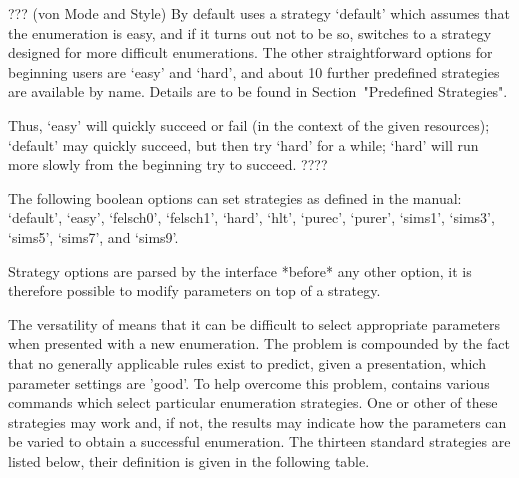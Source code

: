 \enditems



??? (von Mode and Style)
By default  {\ACE} uses  a strategy `default'  which assumes  that the
enumeration is easy, and if it turns out not to be so, {\ACE} switches
to  a strategy designed  for more  difficult enumerations.   The other
straightforward options for beginning users are `easy' and `hard', and
about 10 further predefined  strategies are available by name. Details
are to be found in Section~"Predefined Strategies".

Thus, `easy' will quickly succeed or fail (in the context of the given
resources); `default' may  quickly succeed, but then try  `hard' for a
while; `hard' will run more slowly from the beginning try to succeed.
????






The following  boolean options  can set strategies  as defined  in the
{\ACE} manual: `default', `easy', `felsch0', `felsch1', `hard', `hlt',
`purec', `purer', `sims1', `sims3', `sims5', `sims7', and `sims9'.

Strategy options are parsed by the interface *before* any other option, it
is therefore possible to modify parameters on top of a strategy.

The versatility  of {\ACE}  means that it  can be difficult  to select
appropriate  parameters when  presented with  a new  enumeration.  The
problem is compounded  by the fact that no  generally applicable rules
exist to  predict, given a presentation, which  parameter settings are
'good'.   To help  overcome  this problem,  {\ACE} contains  various
commands which select particular enumeration strategies.  One or other
of these strategies may work and, if not, the results may indicate how
the parameters can be varied  to obtain a successful enumeration.  The
thirteen  standard strategies  are listed  below, their  definition is
given in the following table.

